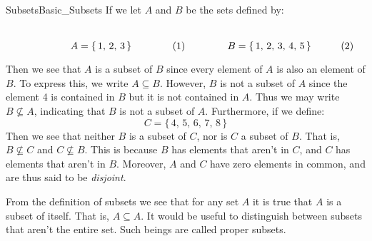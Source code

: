         \begin{lexample}{Subsets}{Basic_Subsets}
            If we let $A$ and $B$ be the sets defined by:
            \par
            \begin{subequations}
                \begin{minipage}[b]{0.49\textwidth}
                    \centering
                    \begin{equation}
                        A=\{\,1,\,2,\,3\,\}
                    \end{equation}
                \end{minipage}
                \hfill
                \begin{minipage}[b]{0.49\textwidth}
                    \centering
                    \begin{equation}
                        B=\{\,1,\,2,\,3,\,4,\,5\,\}
                    \end{equation}
                \end{minipage}
            \end{subequations}
            \par\vspace{2.5ex}
            Then we see that $A$ is a subset of $B$ since every element of
            $A$ is also an element of $B$. To express this, we write
            $A\subseteq{B}$. However, $B$ is not a subset of $A$ since the
            element 4 is contained in $B$ but it is not contained in $A$.
            Thus we may write $B\nsubseteq{A}$, indicating that $B$ is not a
            subset of $A$. Furthermore, if we define:
            \begin{equation}
                C=\{\,4,\,5,\,6,\,7,\,8\,\}
            \end{equation}
            Then we see that neither $B$ is a subset of $C$, nor is $C$ a
            subset of $B$. That is, $B\nsubseteq{C}$ and $C\nsubseteq{B}$.
            This is because $B$ has elements that aren't in $C$, and
            $C$ has elements that aren't in $B$. Moreover, $A$ and $C$ have
            zero elements in common, and are thus said to be
            \textit{disjoint}.
        \end{lexample}
        From the definition of subsets we see that for any set $A$ it is
        true that $A$ is a subset of itself. That is, $A\subseteq{A}$. It
        would be useful to distinguish between subsets that aren't the entire
        set. Such beings are called proper subsets.
